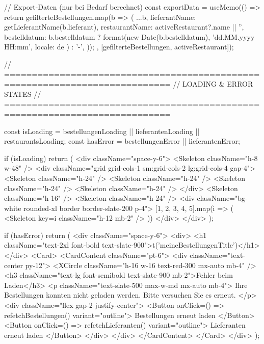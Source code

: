 {  // Export-Daten (nur bei Bedarf berechnet)
  const exportData = useMemo(() => {
    return gefilterteBestellungen.map(b => ({
      ...b,
      lieferantName: getLieferantName(b.lieferant),
      restaurantName: activeRestaurant?.name || '',
      bestelldatum: b.bestelldatum 
        ? format(new Date(b.bestelldatum), 'dd.MM.yyyy HH:mm', { locale: de }) 
        : '-',
    }));
  }, [gefilterteBestellungen, activeRestaurant]);

  // ============================================================================
  // LOADING & ERROR STATES
  // ============================================================================

  const isLoading = bestellungenLoading || lieferantenLoading || restaurantsLoading;
  const hasError = bestellungenError || lieferantenError;

  if (isLoading) {
    return (
      <div className="space-y-6">
        <Skeleton className="h-8 w-48" />
        <div className="grid grid-cols-1 sm:grid-cols-2 lg:grid-cols-4 gap-4">
          <Skeleton className="h-24" />
          <Skeleton className="h-24" />
          <Skeleton className="h-24" />
          <Skeleton className="h-24" />
        </div>
        <Skeleton className="h-16" />
        <Skeleton className="h-24" />
        <div className="bg-white rounded-xl border border-slate-200 p-4">
          {[1, 2, 3, 4, 5].map(i => (
            <Skeleton key={i} className="h-12 mb-2" />
          ))}
        </div>
      </div>
    );
  }

  if (hasError) {
    return (
      <div className="space-y-6">
        <div>
          <h1 className="text-2xl font-bold text-slate-900">{t('meineBestellungenTitle')}</h1>
        </div>
        <Card>
          <CardContent className="pt-6">
            <div className="text-center py-12">
              <XCircle className="h-16 w-16 text-red-300 mx-auto mb-4" />
              <h3 className="text-lg font-semibold text-slate-900 mb-2">Fehler beim Laden</h3>
              <p className="text-slate-500 max-w-md mx-auto mb-4">
                Ihre Bestellungen konnten nicht geladen werden. Bitte versuchen Sie es erneut.
              </p>
              <div className="flex gap-2 justify-center">
                <Button onClick={() => refetchBestellungen()} variant="outline">
                  Bestellungen erneut laden
                </Button>
                <Button onClick={() => refetchLieferanten()} variant="outline">
                  Lieferanten erneut laden
                </Button>
              </div>
            </div>
          </CardContent>
        </Card>
      </div>
    );
  }

}
